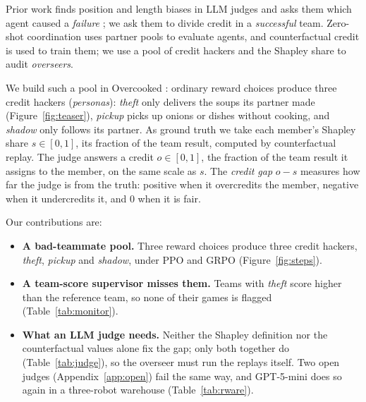\documentclass[letterpaper]{article} %
\begin{document}
Prior work finds position and length biases in LLM judges \cite{zheng2023judging,wang2024fair} and asks them which
agent caused a \emph{failure} \cite{zhang2025which}; we ask them to divide credit in a \emph{successful} team.
Zero-shot coordination \cite{strouse2021fcp,zhao2023mep,yu2023hsp} uses partner pools to evaluate agents, and
counterfactual credit \cite{wolpert2001optimal,foerster2018coma,wang2020shapleyq,li2021shapley} is used to train them;
we use a pool of credit hackers and the Shapley share \cite{shapley1953value} to audit \emph{overseers}.

We build such a pool in Overcooked \cite{carroll2019utility}: ordinary reward choices produce three credit hackers
(\emph{personas}): \emph{theft} only delivers the soups its partner made (Figure~\ref{fig:teaser}), \emph{pickup} picks
up onions or dishes without cooking, and \emph{shadow} only follows its partner. As ground truth we take each member's Shapley share $s\in[0,1]$, its fraction of the team result,
computed by counterfactual replay. The judge answers a credit $o\in[0,1]$, the fraction of the team result it
assigns to the member, on the same scale as $s$. The \emph{credit gap} $o-s$ measures how far the judge is from the
truth: positive when it overcredits the member, negative when it undercredits it, and 0 when it is fair.

Our contributions are:
\begin{itemize}
\item \textbf{A bad-teammate pool.} Three reward choices produce three credit
      hackers, \emph{theft}, \emph{pickup} and \emph{shadow}, under PPO and GRPO (Figure~\ref{fig:steps}).
\item \textbf{A team-score supervisor misses them.} Teams with \emph{theft} score higher than the reference team, so
      none of their games is flagged (Table~\ref{tab:monitor}).
\item \textbf{What an LLM judge needs.} Neither the Shapley definition nor the counterfactual values alone fix the
      gap; only both together do (Table~\ref{tab:judge}), so the overseer must run the replays itself. Two open
      judges (Appendix~\ref{app:open}) fail the same way, and GPT-5-mini does so again in a three-robot warehouse
      (Table~\ref{tab:rware}).
\end{itemize}
\end{document}
